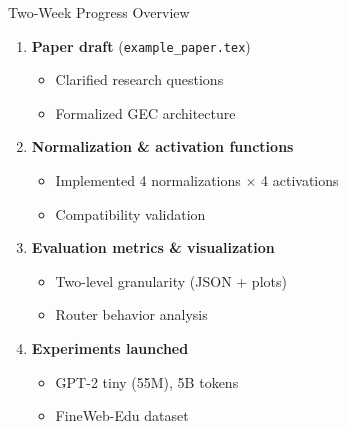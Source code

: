 \documentclass{beamer}
\begin{document}
\begin{frame}{Two-Week Progress Overview}
    \begin{enumerate}
        \item \textbf{Paper draft} (\texttt{example\_paper.tex})
        \begin{itemize}
            \item Clarified research questions
            \item Formalized GEC architecture
        \end{itemize}
    
        \item \textbf{Normalization \& activation functions}
        \begin{itemize}
            \item Implemented 4 normalizations $\times$ 4 activations
            \item Compatibility validation
        \end{itemize}
    
        \item \textbf{Evaluation metrics \& visualization}
        \begin{itemize}
            \item Two-level granularity (JSON + plots)
            \item Router behavior analysis
        \end{itemize}
    
        \item \textbf{Experiments launched}
        \begin{itemize}
            \item GPT-2 tiny (55M), 5B tokens
            \item FineWeb-Edu dataset
        \end{itemize}
    \end{enumerate}
    \end{frame}
    
\end{document}
